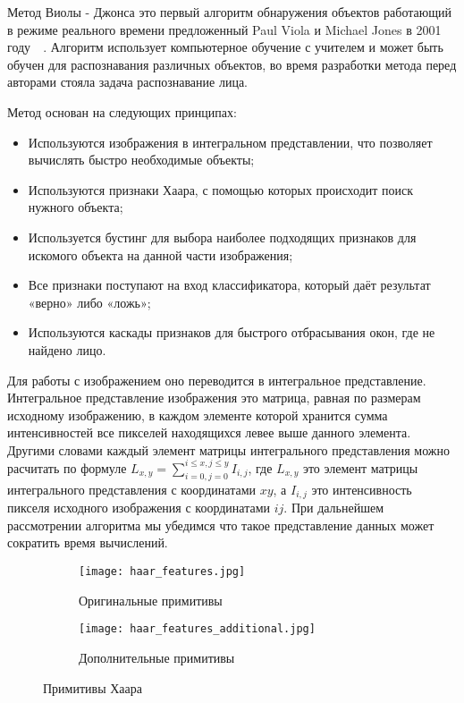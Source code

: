 Метод Виолы - Джонса  это первый алгоритм обнаружения объектов работающий в режиме реального времени предложенный Paul Viola и Michael Jones в 2001 году~\cite{viola_jones_wiki}~\cite{viola_jones_habr}. Алгоритм использует компьютерное обучение с учителем и может быть обучен для распознавания различных объектов, во время разработки метода перед авторами стояла задача распознавание лица. 

Метод основан на следующих принципах:
\begin{itemize}
  \item Используются изображения в интегральном представлении, что позволяет вычислять быстро необходимые объекты;
  \item Используются признаки Хаара, с помощью которых происходит поиск нужного объекта;
  \item Используется бустинг для выбора наиболее подходящих признаков для искомого объекта на данной части изображения;
  \item Все признаки поступают на вход классификатора, который даёт результат «верно» либо «ложь»;
  \item Используются каскады признаков для быстрого отбрасывания окон, где не найдено лицо.
\end{itemize}

Для работы с изображением оно переводится в интегральное представление. Интегральное представление изображения это матрица, равная по размерам исходному изображению, в каждом элементе которой хранится сумма интенсивностей все пикселей находящихся левее выше данного элемента. Другими словами каждый элемент матрицы интегрального представления можно расчитать по формуле 
$ L_{x,y} = \sum_{i=0,j=0}^{i \leq x, j \leq y} I_{i,j} $, где $L_{x,y}$ это элемент матрицы интегрального представления с координатами $xy$, а $I_{i,j}$ это интенсивность пикселя исходного изображения с координатами $ij$.
При дальнейшем рассмотрении алгоритма мы убедимся что такое представление данных может сократить время вычислений.


\begin{figure}[ht]
\centering
  \begin{subfigure}[b]{0.4\textwidth} 
    \centering
    \texttt{[image: haar\_features.jpg]}  
    \caption{Оригинальные примитивы}
  \end{subfigure}
  \begin{subfigure}[b]{0.4\textwidth} 
    \centering
    \texttt{[image: haar\_features\_additional.jpg]}  
    \caption{Дополнительные примитивы}
  \end{subfigure}
  \caption{Примитивы Хаара}
  \label{fig:domain:search:violajones:haar_features}
\end{figure}

